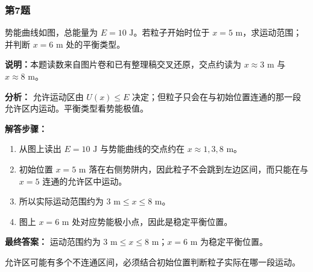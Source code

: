 \documentclass[12pt,a4paper]{ctexart}
\begin{document}
\subsubsection*{第7题}
\begin{tcolorbox}[colback=gray!2!white,colframe=black!60,title={题目}]
势能曲线如图，总能量为 \(E=10\text{ J}\)。若粒子开始时位于 \(x=5\text{ m}\)，求运动范围；并判断 \(x=6\text{ m}\) 处的平衡类型。\par
\vspace{0.4em}
\textbf{说明：}本题读数来自图片卷和已有整理稿交叉还原，交点约读为 \(x\approx 3\text{ m}\) 与 \(x\approx 8\text{ m}\)。\par
\end{tcolorbox}
\begin{tcolorbox}[colback=blue!2!white,colframe=blue!55!black,title={完整答案}]
\textbf{分析：}
允许运动区由 \(U(x)\le E\) 决定；但粒子只会在与初始位置连通的那一段允许区内运动。平衡类型看势能极值。\par
\textbf{解答步骤：}
\begin{enumerate}
\item 从图上读出 \(E=10\text{ J}\) 与势能曲线的交点约在 \(x\approx 1,3,8\text{ m}\)。
\item 初始位置 \(x=5\text{ m}\) 落在右侧势阱内，因此粒子不会跳到左边区间，而只能在与 \(x=5\) 连通的允许区中运动。
\item 所以实际运动范围约为 \(3\text{ m}\le x\le 8\text{ m}\)。
\item 图上 \(x=6\text{ m}\) 处对应势能极小点，因此是稳定平衡位置。
\end{enumerate}
\textbf{最终答案：}
运动范围约为 \(3\text{ m}\le x\le 8\text{ m}\)；\(x=6\text{ m}\) 为稳定平衡位置。\par
\end{tcolorbox}
\begin{tcolorbox}[colback=red!2!white,colframe=red!55!black,title={易错点}]
允许区可能有多个不连通区间，必须结合初始位置判断粒子实际在哪一段运动。\par
\end{tcolorbox}
\end{document}
